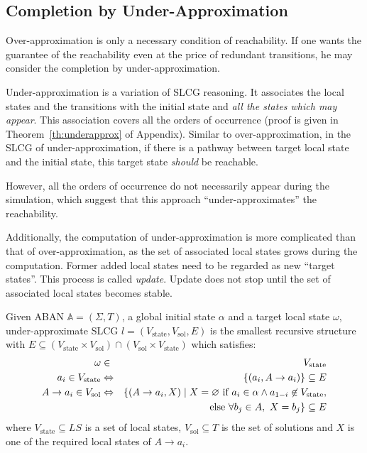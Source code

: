 \subsection{Completion by Under-Approximation}\label{sec:completionUnder}
Over-approximation is only a necessary condition of reachability.
If one wants the guarantee of the reachability even at the price of redundant transitions, he may consider the completion by under-approximation.

Under-approximation is a variation of SLCG reasoning. 
It associates the local states and the transitions with the initial state and \textit{all the states which may appear}.
This association covers all the orders of occurrence (proof is given in Theorem~\ref{th:underapprox} of Appendix).
Similar to over-approximation, in the SLCG of under-approximation, if there is a pathway between target local state and the initial state, this target state \textit{should} be reachable.

However, all the orders of occurrence do not necessarily appear during the simulation, which suggest that this approach ``under-approximates'' the reachability.

Additionally, the computation of under-approximation is more complicated than that of over-approximation, as the set of associated local states grows during the computation.
Former added local states need to be regarded as new ``target states''.
This process is called \textit{update}. 
Update does not stop until the set of associated local states becomes stable.


\begin{definition}
Given ABAN $\mathbb{A} = (\Sigma,T)$, a global initial state $\alpha$ and a target local state $\omega$, under-approximate SLCG $l= (V_{\mathrm{state}},V_{\mathrm{sol}},E)$ is the smallest recursive structure with $E \subseteq (V_{\mathrm{state}}\times V_{\mathrm{sol}})\cap (V_{\mathrm{sol}}\times V_{\mathrm{state}})$ which satisfies:
\begin{eqnarray*}
    \omega&\in& V_{\mathrm{state}} \\
    a_i\in V_{\mathrm{state}} &\Leftrightarrow& \{ (a_i, A\to a_i)\}\subseteq E \\
    A\to a_i\in V_{\mathrm{sol}}&\Leftrightarrow& \{ (A\to a_i,X)\mid X= \varnothing \text{ \rm if } a_i\in \alpha\land a_{1-i}\not\in V_{\mathrm{state}},\\
    &&\text{else } \forall b_j\in A,\ X= b_j\}\subseteq E
\end{eqnarray*}
where $V_{\mathrm{state}}\subseteq LS$ is a set of local states, $V_{\mathrm{sol}}\subseteq T$ is the set of solutions and $X$ is one of the required local states of $A\to a_i$. 
\end{definition}


